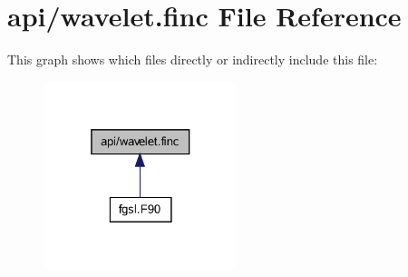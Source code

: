 \hypertarget{wavelet_8finc}{}\section{api/wavelet.finc File Reference}
\label{wavelet_8finc}
This graph shows which files directly or indirectly include this file\+:\nopagebreak
\begin{figure}[H]
\begin{center}
\leavevmode
\includegraphics[width=160pt]{wavelet_8finc__dep__incl}
\end{center}
\end{figure}
